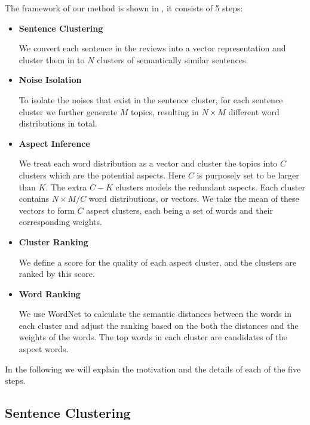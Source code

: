 The framework of our method is shown in , 
it consists of 5 steps:

\begin{itemize}
    \item \textbf{Sentence Clustering}

        We convert each sentence in the reviews into a vector representation 
        and cluster them in to $N$ clusters of semantically similar sentences.

    \item \textbf{Noise Isolation}

        To isolate the noises that exist in the sentence cluster,
	for each sentence cluster we further generate $M$ 
	topics, resulting in $N\times M$ different word distributions in total.

    \item \textbf{Aspect Inference}
        
        We treat each word distribution as a vector and cluster the topics 
	into $C$ clusters which are the potential aspects. 
	Here $C$ is purposely set to be larger than $K$. The extra
	$C-K$ clusters models the redundant aspects.
        Each cluster contains $N\times M / C$ word distributions, or vectors.
        We take the mean of these vectors to form $C$ aspect clusters,
        each being a set of words and their corresponding weights.

    \item \textbf{Cluster Ranking}

        We define a score for the quality of each aspect cluster,
        and the clusters are ranked by this score.

    \item \textbf{Word Ranking}

        We use WordNet to calculate the semantic distances between the words 
	in each cluster and adjust the ranking based on the 
	both the distances and the weights of the words. The top words in each
	cluster are candidates of the aspect words.
\end{itemize}

In the following we will explain the motivation and the details of each of
the five steps. 

\subsection{Sentence Clustering}

